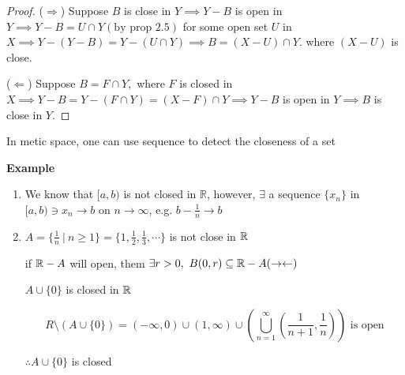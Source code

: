 \begin{proof}
	($\Rightarrow$) Suppose $B$ is close in $Y \implies Y - B$ is open in $Y \implies Y-B = U \cap Y(\text{by prop 2.5})$ for some open set $U$ in $X \implies Y - (Y-B) = Y-(U \cap Y) \implies B = (X - U) \cap Y$. where $(X - U)$ is close.
	
	($\Leftarrow$) Suppose $B = F \cap Y,$ where $F$ is closed in $X \implies Y - B = Y-(F \cap Y) = (X-F) \cap Y \implies Y - B$ is open in $Y \implies B$ is close in $Y$.
\end{proof}

In metic space, one can use sequence to detect the closeness of a set

\textbf{Example}

\begin{enumerate}[wide,label=\textbf{\arabic*.}]
	\item We know that $[a,b)$ is not closed in $\mathbb R$, however, $\exists$ a sequence $\{x_n\}$ in $[a,b) \ni x_n \rightarrow b$ on $n \rightarrow \infty$, e.g. $b - \frac{1}{n} \rightarrow b$
	\item $A = \{\frac{1}{n}~|~n \geq 1\} = \{1,\frac{1}{2},\frac{1}{3},\cdots\}$ is not close in $\mathbb{R}$
	
	if $\mathbb{R} - A$ will open, them $\exists r>0,~B(0,r) \subseteq \mathbb{R} - A(\rightarrow\leftarrow)$
	
	$A \cup \{0\}$ is closed in $\mathbb{R}$
	
	$$R \setminus (A \cup \{0\}) = (-\infty,0)\cup(1,\infty)\cup(\bigcup^{\infty}_{n=1}(\frac{1}{n+1},\frac{1}{n})) \text{ is open}$$
	
	$\therefore A \cup \{0\}$ is closed
\end{enumerate}



